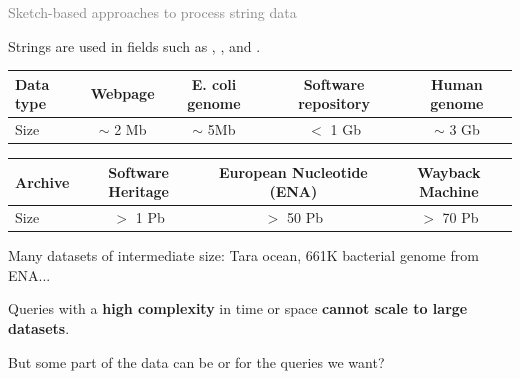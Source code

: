 \begin{frame}{\textcolor{gray}{Sketch-based approaches to process  string data}}

    {\small Strings are used in fields such as , , and .}
    \begin{center}
        \pause
        \begin{tabular}{l c c c c}
            Data type & \textcolor{black!10!myblue}{Webpage} &  \textcolor{black!10!mygreen}{E. coli genome} & \textcolor{black!10!myorange}{Software repository} & \textcolor{black!10!mygreen}{Human genome}\\ \hline
            Size & $\sim$ 2 Mb & $\sim$ 5Mb &  $<$ 1 Gb & $\sim$ 3 Gb 
        \end{tabular}\pause

        \bigskip

        \begin{tabular}{l c c c}
            Archive & \textcolor{black!10!myorange}{Software Heritage} & \textcolor{black!10!mygreen}{European Nucleotide (ENA)} & \textcolor{black!10!myblue}{Wayback Machine}  \\ \hline
            Size & $>$ 1 Pb & $>$ 50 Pb &  $>$ 70 Pb
        \end{tabular}
    \end{center}\pause

    \bigskip
    Many datasets of intermediate size: Tara ocean, 661K bacterial genome from ENA...\pause

    \bigskip

    Queries with a \textbf{high complexity} in time or space \textbf{cannot scale to large datasets}. \pause

    \bigskip

    But some part of the data can be  or  for the queries we want?\pause

\end{frame}

